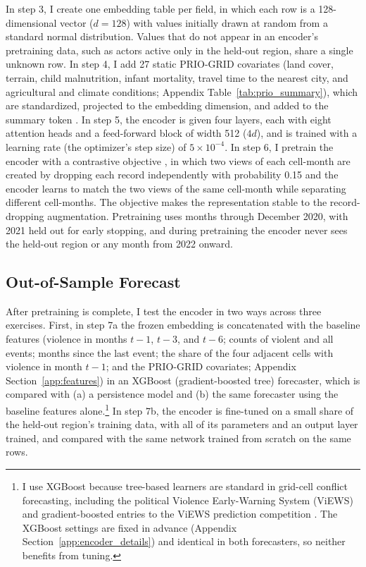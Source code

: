 \documentclass[11pt, letterpaper]{article}
\begin{document}
In step 3, I create one embedding table per field, in which each row is a 128-dimensional vector ($d = 128$) with values initially drawn at random from a standard normal distribution. Values that do not appear in an encoder's pretraining data, such as actors active only in the held-out region, share a single unknown row. In step 4, I add 27 static PRIO-GRID covariates (land cover, terrain, child malnutrition, infant mortality, travel time to the nearest city, and agricultural and climate conditions; Appendix Table~\ref{tab:prio_summary}), which are standardized, projected to the embedding dimension, and added to the summary token \citep{tollefsen2012priogrid}. In step 5, the encoder is given four layers, each with eight attention heads and a feed-forward block of width 512 ($4d$), and is trained with a learning rate (the optimizer's step size) of $5 \times 10^{-4}$. In step 6, I pretrain the encoder with a contrastive objective \citep{chen2020simclr}, in which two views of each cell-month are created by dropping each record independently with probability 0.15 and the encoder learns to match the two views of the same cell-month while separating different cell-months. The objective makes the representation stable to the record-dropping augmentation. Pretraining uses months through December 2020, with 2021 held out for early stopping, and during pretraining the encoder never sees the held-out region or any month from 2022 onward.




\subsection{Out-of-Sample Forecast}
After pretraining is complete, I test the encoder in two ways across three exercises. First, in step 7a the frozen embedding is concatenated with the baseline features (violence in months $t-1$, $t-3$, and $t-6$; counts of violent and all events; months since the last event; the share of the four adjacent cells with violence in month $t-1$; and the PRIO-GRID covariates; Appendix Section~\ref{app:features}) in an XGBoost (gradient-boosted tree) forecaster, which is compared with (a) a persistence model and (b) the same forecaster using the baseline features alone.\footnote{I use XGBoost because tree-based learners are standard in grid-cell conflict forecasting, including the political Violence Early-Warning System (ViEWS) \citep{hegre2021views2020} and gradient-boosted entries to the ViEWS prediction competition \citep{vestby2022gradient}. The XGBoost settings are fixed in advance (Appendix Section~\ref{app:encoder_details}) and identical in both forecasters, so neither benefits from tuning.} In step 7b, the encoder is fine-tuned on a small share of the held-out region's training data, with all of its parameters and an output layer trained, and compared with the same network trained from scratch on the same rows. 
\end{document}
